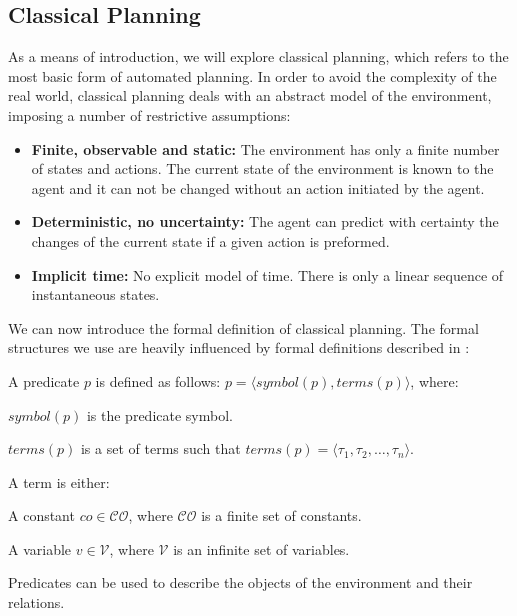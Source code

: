 \subsection{Classical Planning}

As a means of introduction, we will explore classical planning, 
which refers to the most basic form of automated planning.
In order to avoid the complexity of the real world, classical 
planning deals with an abstract model of the environment, 
imposing a number of restrictive assumptions:

\begin{itemize}
    \item 
    \textbf{Finite, observable and static:}
    The environment has only a finite number of states and actions. The current state of the environment is known to the agent and it can not be changed without an action initiated by the agent.

    \item 
    \textbf{Deterministic, no uncertainty:}
    The agent can predict with certainty the changes of the current state if a given action is preformed.

    \item 
    \textbf{Implicit time:}
    No explicit model of time. There is only a linear sequence of instantaneous states.
\end{itemize}

We can now introduce the formal definition of classical planning. 
The formal structures we use are heavily influenced by formal definitions 
described in \cite{AutomatedPlanningTheoryghallab2006}\cite{OverviewHierarchicalTaskgeorgievski2014}\cite{alnazer2019htn}:


\begin{Tdef}[Predicate]
    A predicate $p$ is defined as follows: $p= \langle symbol(p), terms(p) \rangle$, where:
    \vspace{-0.5em}
    \begin{compactitem} 
        \item 
        $symbol(p)$ is the predicate symbol.
        \item 
        $terms(p)$ is a set of terms such that $terms(p) = \langle \tau_1, \tau_2, \dots, \tau_n \rangle$.
        \item 
        A term is either:
        \begin{compactitem}
            \item 
            A constant $co \in \mathcal{CO}$, where $\mathcal{CO}$ is a finite set of constants.
            \item 
            A variable $v \in \mathcal{V}$, where $\mathcal{V}$ is an infinite set of variables.
        \end{compactitem}
    \end{compactitem}
    \vspace{-0.5em}
    Predicates can be used to describe the objects of the environment and their relations.
\end{Tdef}

